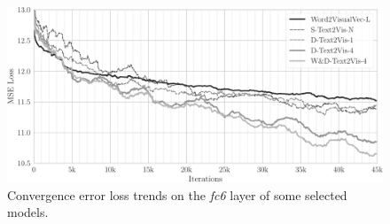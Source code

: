 \begin{figure}
    \includegraphics[width=\linewidth]{convergence-plot}
    \caption{Convergence error loss trends on the \emph{fc6} layer of some selected models.}
    \label{fig:t2v:convergence}
\end{figure}








